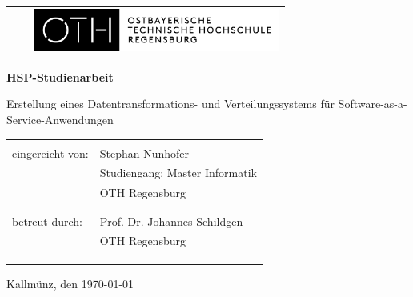 
\thispagestyle{empty}


\begin{center}

\begin{tabular}{cp{.2cm}c}
 &  & \includegraphics [height=1.4cm]{Bilder/Titel/OTH_Logo_3line_pos_b.png}%
\end{tabular}

\vspace{4cm}



\noindent 
\textbf{\Huge{HSP-Studienarbeit}}

\vspace{1.5cm}

\noindent 
{\Large{Erstellung eines Datentransformations- und Verteilungssystems für Software-as-a-Service-Anwendungen}}


\vspace{3cm}

\begin{tabular}{ll}
\tabularnewline
\tabularnewline
eingereicht von:\hspace{1cm} & Stephan Nunhofer\tabularnewline
 & Studiengang: Master Informatik\tabularnewline
 & OTH Regensburg\tabularnewline
 & \tabularnewline
 & \tabularnewline
betreut durch: & Prof. Dr. Johannes Schildgen\tabularnewline
 & OTH Regensburg\tabularnewline
 & \tabularnewline
 & \tabularnewline
 & \tabularnewline
 
\end{tabular}

\end{center}
\begin{center}
Kallmünz, den \today
\end{center}

\thispagestyle{empty}

